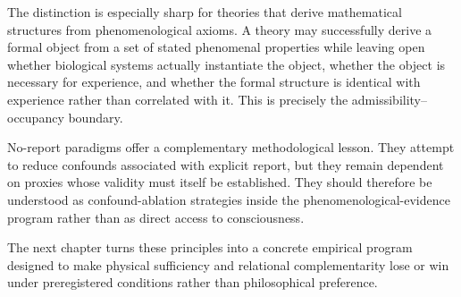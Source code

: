 The distinction is especially sharp for theories that derive mathematical structures from phenomenological axioms. A theory may successfully derive a formal object from a set of stated phenomenal properties while leaving open whether biological systems actually instantiate the object, whether the object is necessary for experience, and whether the formal structure is identical with experience rather than correlated with it. This is precisely the admissibility--occupancy boundary.

No-report paradigms offer a complementary methodological lesson. They attempt to reduce confounds associated with explicit report, but they remain dependent on proxies whose validity must itself be established. They should therefore be understood as confound-ablation strategies inside the phenomenological-evidence program rather than as direct access to consciousness.

The next chapter turns these principles into a concrete empirical program designed to make physical sufficiency and relational complementarity lose or win under preregistered conditions rather than philosophical preference.
